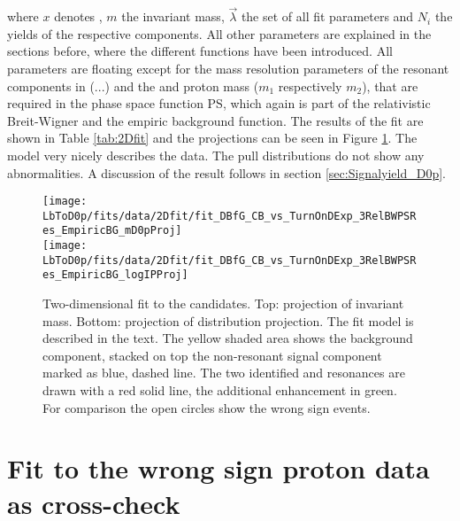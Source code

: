 where $x$ denotes \logIP, $m$ the invariant \Dz\proton mass, $\vec{\lambda}$ the set of all fit parameters and $N_i$ the yields of the respective components.
All other parameters are explained in the sections before, where the different functions have been introduced.
All parameters are floating except for the mass resolution parameters of the resonant components in \RES(...) and the \Dz and proton mass ($m_1$ respectively $m_2$), that are required in the phase space function PS, which again is part of the relativistic Breit-Wigner and the empiric background function. 
The results of the fit are shown in Table \ref{tab:2Dfit} and the projections can be seen in Figure \ref{fig:fit2D}.
The model very nicely describes the data.
The pull distributions do not show any abnormalities.
A discussion of the result follows in section \ref{sec:Signalyield_D0p}.
\begin{figure}[ptb]
	\centering
	\texttt{[image: LbToD0p/fits/data/2Dfit/fit\_DBfG\_CB\_vs\_TurnOnDExp\_3RelBWPSRes\_EmpiricBG\_mD0pProj]} \\
	\texttt{[image: LbToD0p/fits/data/2Dfit/fit\_DBfG\_CB\_vs\_TurnOnDExp\_3RelBWPSRes\_EmpiricBG\_logIPProj]}
	\caption{Two-dimensional fit to the \LbToDpmunuX candidates. Top: projection of invariant \Dz\proton mass. Bottom: projection of \logIP distribution projection.
             The fit model is described in the text.
             The yellow shaded area shows the background component, stacked on top the non-resonant signal component marked as blue, dashed line.
             The two identified \LcResI and \LcResII resonances are drawn with a red solid line, the additional enhancement in green.
             For comparison the open circles show the wrong sign events.}
	\label{fig:fit2D}
\end{figure}


\section{Fit to the wrong sign proton data as cross-check}

